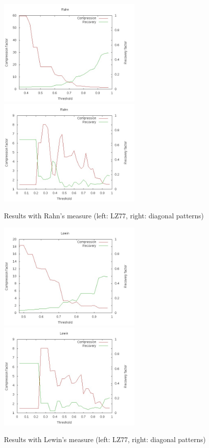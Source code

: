 \documentclass[a4paper,10pt]{article}
\begin{document}
\begin{figure}[h!]
\centering
\includegraphics[width=7cm]{images/Rahn77.jpg}\hspace{0.5cm}
\includegraphics[width=7cm]{images/RahnDiag.jpg}
\caption{Results with Rahn's measure (left: LZ77, right: diagonal patterns)\label{rahn}}
\end{figure}

\begin{figure}[h!]
\centering
\includegraphics[width=7cm]{images/Lewin77.jpg}\hspace{0.5cm}
\includegraphics[width=7cm]{images/LewinDiag.jpg}
\caption{Results with Lewin's measure (left: LZ77, right: diagonal patterns)\label{lewin}}
\end{figure}
\end{document}
